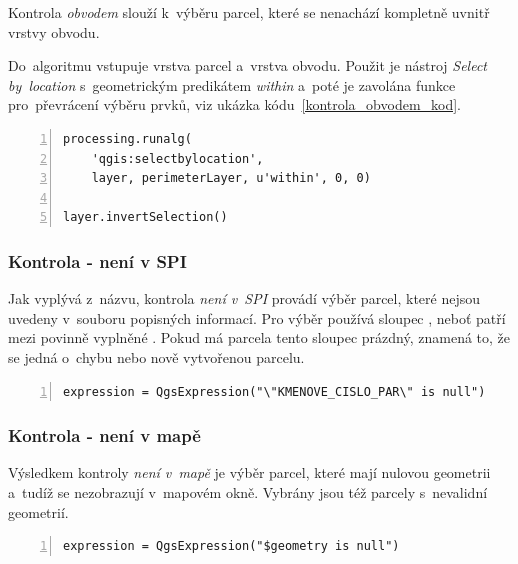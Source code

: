 Kontrola \textit{obvodem} slouží k~výběru parcel, které se nenachází kompletně uvnitř vrstvy obvodu.

Do~algoritmu vstupuje vrstva parcel a~vrstva obvodu. Použit je nástroj \textit{Select by~location} s~geometrickým predikátem \textit{within} a~poté je zavolána funkce pro~převrácení výběru prvků, viz ukázka kódu~\ref{kontrola_obvodem_kod}.

{\scriptsize
\begin{lstlisting}[style=python, caption={Kontrola \textit{obvodem}~– výběr prvků}, captionpos=b, label=kontrola_obvodem_kod, backgroundcolor = \color{light-gray},  numbers=left]
processing.runalg(
    'qgis:selectbylocation',
    layer, perimeterLayer, u'within', 0, 0)

layer.invertSelection()
\end{lstlisting}}

\subsubsection{Kontrola - není v SPI}
\label{kontrola_neni_v_spi}

Jak vyplývá z~názvu, kontrola \textit{není v~SPI} provádí výběr parcel, které nejsou uvedeny v~souboru popisných informací. Pro výběr používá sloupec \texttt{}, neboť patří mezi povinně vyplněné \citep{struktura_vfk}. Pokud má parcela tento sloupec prázdný, znamená to, že se jedná o~chybu nebo nově vytvořenou parcelu.

{\scriptsize
\begin{lstlisting}[style=python, caption={Kontrola \textit{není v~SPI}~– vzorec pro~výběr prvků}, captionpos=b, label=kontrola_spi_kod, backgroundcolor = \color{light-gray},  numbers=left]
expression = QgsExpression("\"KMENOVE_CISLO_PAR\" is null")
\end{lstlisting}}

\subsubsection{Kontrola - není v mapě}
\label{kontrola_neni_v_mape}

Výsledkem kontroly \textit{není v~mapě} je výběr parcel, které mají nulovou geometrii a~tudíž se nezobrazují v~mapovém okně. Vybrány jsou též parcely s~nevalidní geometrií.

{\scriptsize
\begin{lstlisting}[style=python, caption={Kontrola \textit{není v~mapě}~– vzorec pro~výběr prvků}, captionpos=b, label=kontrola_mapa_kod, backgroundcolor = \color{light-gray},  numbers=left]
expression = QgsExpression("$geometry is null")
\end{lstlisting}}

